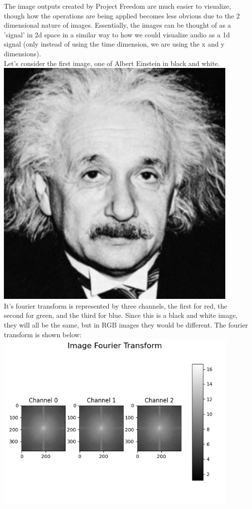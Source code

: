 \documentclass[notitlepage]{article}
\begin{document}
The image outputs created by Project Freedom are much easier to visualize,
though how the operations are being applied becomes less obvious due to the
2 dimensional nature of images. Essentially, the images can be thought of as
a 'signal' in 2d space in a similar way to how we could visualize audio as a
1d signal (only instead of using the time dimension, we are using the x and y
dimensions).
\\
Let's consider the first image, one of Albert Einstein in black and white.
\\
\includegraphics[width=4.75in]{../assets/images/einstein.png}
\\
It's fourier transform is represented by three channels, the first for red, the
second for green, and the third for blue. Since this is a black and white image,
they will all be the same, but in RGB images they would be different. The fourier transform
is shown below:
\\
\includegraphics[width=4.75in]{../samples/images/einstein_fourier_transform.png}
\end{document}
